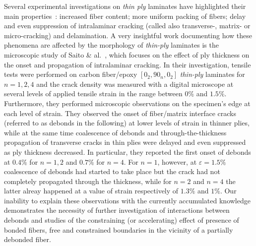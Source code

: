 \documentclass[review]{elsarticle}
\begin{document}
Several experimental investigations on \emph{thin ply} laminates have highlighted their main properties~\cite{Sasayama2003,Sihn2007,Yokozeki2008,Yokozeki2010,Arteiro2014,Amacher2014,Cugnoni2018}: increased fiber content; more uniform packing of fibers; delay and even suppression of intralaminar cracking (called also transverse-, matrix- or micro-cracking) and delamination. A very insightful work documenting how these phenomena are affected by the morphology of \emph{thin-ply} laminates is the microscopic study of Saito \& al.~\cite{Saito2012}, which focuses on the effect of ply thickness on the onset and propagation of intralaminar cracking. In their investigation, tensile tests were performed on carbon fiber/epoxy $\left[0_{2},90_{n},0_{2}\right]$ \emph{thin-ply} laminates for $n=1,2,4$ and the crack density was measured with a digital microscope at several levels of applied tensile strain in the range between $0\%$ and $1.5\%$. Furthermore, they performed microscopic observations on the specimen's edge at each level of strain. They observed the onset of fiber/matrix interface cracks (referred to as debonds in the following) at lower levels of strain in thinner plies, while at the same time coalescence of debonds and through-the-thickness propagation of transverse cracks in thin plies were delayed and even suppressed as ply thickness decreased. In particular, they reported the first onset of debonds at $0.4\%$ for $n=1,2$ and $0.7\%$ for $n=4$. For $n=1$, however, at $\varepsilon=1.5\%$ coalescence of debonds had started to take place but the crack had not completely propagated through the thickness, while for $n=2$ and $n=4$ the latter alreay happened at a value of strain respectively of $1.3\%$ and $1\%$. Our inability to explain these observations with the currently accumulated knowledge demonstrates the necessity of further investigation of interactions between debonds and studies of the constraining (or accelerating) effect of presence of bonded fibers, free and constrained boundaries in the vicinity of a partially debonded fiber.\\
\end{document}
